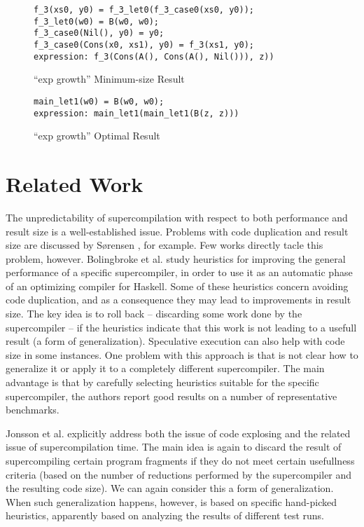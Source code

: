 \documentclass[submission,copyright,creativecommons]{eptcs}
\begin{document}
\begin{figure}
\begin{lstlisting}
f_3(xs0, y0) = f_3_let0(f_3_case0(xs0, y0));
f_3_let0(w0) = B(w0, w0);
f_3_case0(Nil(), y0) = y0;
f_3_case0(Cons(x0, xs1), y0) = f_3(xs1, y0);
expression: f_3(Cons(A(), Cons(A(), Nil())), z))
\end{lstlisting}
\caption{``exp growth'' Minimum-size Result}
\label{fig:ExpGrowthMinResult}
\end{figure}

\begin{figure}
\begin{lstlisting}
main_let1(w0) = B(w0, w0);
expression: main_let1(main_let1(B(z, z)))
\end{lstlisting}
\caption{``exp growth'' Optimal Result}
\label{fig:ExpGrowthOptResult}
\end{figure}

\section{Related Work}

The unpredictability of supercompilation with respect to both performance and
result size is a well-established issue.
Problems with code duplication and result size are discussed by S{\o}rensen \cite{Sorensen1994TurchinSupercompiler}, 
for example.
Few works directly tacle this problem, however.
Bolingbroke et al. \cite{bolingbroke2011improving} study heuristics for improving the general
performance of a specific supercompiler, in order to use it as an automatic phase of an optimizing 
compiler for Haskell.
Some of these heuristics concern avoiding code duplication, and as a consequence they may
lead to improvements in result size.
The key idea is to roll back -- discarding some work done by the supercompiler -- if the heuristics
indicate that this work is not leading to a usefull result (a form of generalization).
Speculative execution can also help with code size in some instances.
One problem with this approach is that is not clear how to generalize it or
apply it to a completely different supercompiler.
The main advantage is that by carefully selecting heuristics suitable for the specific
supercompiler, the authors report good results on a number of representative benchmarks.

Jonsson et al. \cite{Jonsson2011Taming} explicitly address both the issue of code explosing and
the related issue of supercompilation time.
The main idea is again to discard the result of supercompiling certain program fragments
if they do not meet certain usefullness criteria (based on the number of reductions performed 
by the supercompiler and the resulting code size).
We can again consider this a form of generalization.
When such generalization happens, however, is based on specific hand-picked heuristics,
apparently based on analyzing the results of different test runs.
\end{document}
